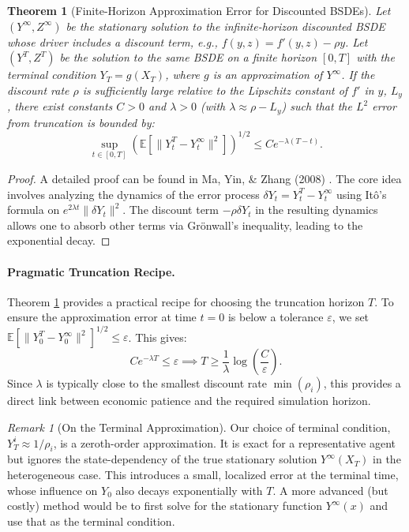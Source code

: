 \documentclass[11pt,letterpaper,oneside]{article}
\theoremstyle{plain}
\newtheorem{theorem}{Theorem}[section]
\theoremstyle{definition}
\theoremstyle{remark}
\newtheorem{remark}{Remark}[section]
\begin{document}
\begin{theorem}[Finite-Horizon Approximation Error for Discounted BSDEs]
\label{thm:infinite_horizon_truncation}
Let $(Y^\infty, Z^\infty)$ be the stationary solution to the infinite-horizon discounted BSDE whose driver includes a discount term, e.g., $f(y,z) = f'(y,z) - \rho y$. Let $(Y^T, Z^T)$ be the solution to the same BSDE on a finite horizon $[0, T]$ with the terminal condition $Y_T = g(X_T)$, where $g$ is an approximation of $Y^\infty$. If the discount rate $\rho$ is sufficiently large relative to the Lipschitz constant of $f'$ in $y$, $L_y$, there exist constants $C > 0$ and $\lambda > 0$ (with $\lambda \approx \rho - L_y$) such that the $L^2$ error from truncation is bounded by:
\[
\sup_{t \in [0,T]} \left( \mathbb{E}\left[ \|Y_t^T - Y_t^\infty\|^2 \right] \right)^{1/2} \le C e^{-\lambda(T-t)}.
\]
\end{theorem}
\begin{proof}
A detailed proof can be found in Ma, Yin, \& Zhang (2008) \cite{MaYinZhang2008}. The core idea involves analyzing the dynamics of the error process $\delta Y_t = Y_t^T - Y_t^\infty$ using Itô's formula on $e^{2\lambda t}\|\delta Y_t\|^2$. The discount term $-\rho \delta Y_t$ in the resulting dynamics allows one to absorb other terms via Grönwall's inequality, leading to the exponential decay.
\end{proof}

\paragraph{Pragmatic Truncation Recipe.} Theorem \ref{thm:infinite_horizon_truncation} provides a practical recipe for choosing the truncation horizon $T$. To ensure the approximation error at time $t=0$ is below a tolerance $\varepsilon$, we set $\mathbb{E}[\|Y_0^T - Y_0^\infty\|^2]^{1/2} \le \varepsilon$. This gives:
\begin{equation}
C e^{-\lambda T} \le \varepsilon \implies T \ge \frac{1}{\lambda} \log\left(\frac{C}{\varepsilon}\right).
\end{equation}
Since $\lambda$ is typically close to the smallest discount rate $\min(\rho_i)$, this provides a direct link between economic patience and the required simulation horizon.

\begin{remark}[On the Terminal Approximation]
Our choice of terminal condition, $Y^i_T \approx 1/\rho_i$, is a zeroth-order approximation. It is exact for a representative agent but ignores the state-dependency of the true stationary solution $Y^\infty(X_T)$ in the heterogeneous case. This introduces a small, localized error at the terminal time, whose influence on $Y_0$ also decays exponentially with $T$. A more advanced (but costly) method would be to first solve for the stationary function $Y^\infty(x)$ and use that as the terminal condition.
\end{remark}
\end{document}
